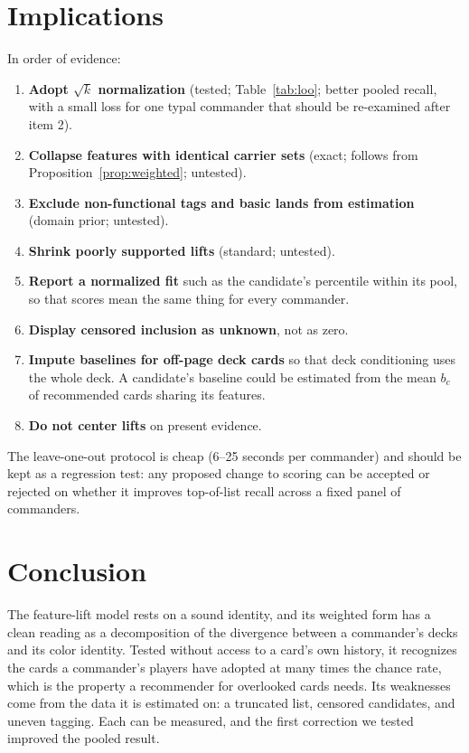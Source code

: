 \documentclass[11pt]{article}
\theoremstyle{remark}
\begin{document}
\section{Implications}\label{sec:impl}
\noindent In order of evidence:
\begin{enumerate}
  \item \textbf{Adopt $\sqrt{k}$ normalization} (tested; Table~\ref{tab:loo};
        better pooled recall, with a small loss for one typal commander that
        should be re-examined after item 2).
  \item \textbf{Collapse features with identical carrier sets} (exact; follows
        from Proposition~\ref{prop:weighted}; untested).
  \item \textbf{Exclude non-functional tags and basic lands from estimation}
        (domain prior; untested).
  \item \textbf{Shrink poorly supported lifts} (standard; untested).
  \item \textbf{Report a normalized fit} such as the candidate's percentile within
        its pool, so that scores mean the same thing for every commander.
  \item \textbf{Display censored inclusion as unknown}, not as zero.
  \item \textbf{Impute baselines for off-page deck cards} so that deck
        conditioning uses the whole deck. A candidate's baseline could be
        estimated from the mean $b_c$ of recommended cards sharing its features.
  \item \textbf{Do not center lifts} on present evidence.
\end{enumerate}
The leave-one-out protocol is cheap (6--25 seconds per commander) and should be
kept as a regression test: any proposed change to scoring can be accepted or
rejected on whether it improves top-of-list recall across a fixed panel of
commanders.

\section{Conclusion}
\noindent The feature-lift model rests on a sound identity, and its weighted form
has a clean reading as a decomposition of the divergence between a commander's
decks and its color identity. Tested without access to a card's own history, it
recognizes the cards a commander's players have adopted at many times the chance
rate, which is the property a recommender for overlooked cards needs. Its
weaknesses come from the data it is estimated on: a truncated list, censored
candidates, and uneven tagging. Each can be measured, and the first correction
we tested improved the pooled result.
\end{document}
